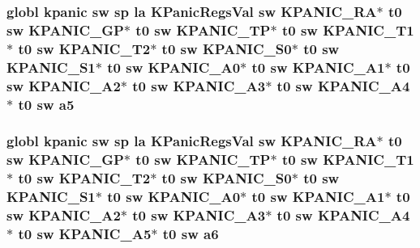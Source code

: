 \hypertarget{riscv_2kpanica_8S_a698ffd93e252f89c9bdbc8787de18d25}{
\subsubsection[{a5}]{\setlength{\rightskip}{0pt plus 5cm}globl {\bf kpanic} {\bf sw} {\bf sp} {\bf la} {\bf K\-Panic\-Regs\-Val} {\bf sw} {\bf K\-P\-A\-N\-I\-C\-\_\-\-R\-A}$\ast$ {\bf t0} {\bf sw} {\bf K\-P\-A\-N\-I\-C\-\_\-\-G\-P}$\ast$ {\bf t0} {\bf sw} {\bf K\-P\-A\-N\-I\-C\-\_\-\-T\-P}$\ast$ {\bf t0} {\bf sw} {\bf K\-P\-A\-N\-I\-C\-\_\-\-T1}$\ast$ {\bf t0} {\bf sw} {\bf K\-P\-A\-N\-I\-C\-\_\-\-T2}$\ast$ {\bf t0} {\bf sw} {\bf K\-P\-A\-N\-I\-C\-\_\-\-S0}$\ast$ {\bf t0} {\bf sw} {\bf K\-P\-A\-N\-I\-C\-\_\-\-S1}$\ast$ {\bf t0} {\bf sw} {\bf K\-P\-A\-N\-I\-C\-\_\-\-A0}$\ast$ {\bf t0} {\bf sw} {\bf K\-P\-A\-N\-I\-C\-\_\-\-A1}$\ast$ {\bf t0} {\bf sw} {\bf K\-P\-A\-N\-I\-C\-\_\-\-A2}$\ast$ {\bf t0} {\bf sw} {\bf K\-P\-A\-N\-I\-C\-\_\-\-A3}$\ast$ {\bf t0} {\bf sw} {\bf K\-P\-A\-N\-I\-C\-\_\-\-A4}$\ast$ {\bf t0} {\bf sw} a5}}\label{riscv_2kpanica_8S_a698ffd93e252f89c9bdbc8787de18d25}
\hypertarget{riscv_2kpanica_8S_a3bb72cecae8c679c54ce80df2f645ba6}{
\subsubsection[{a6}]{\setlength{\rightskip}{0pt plus 5cm}globl {\bf kpanic} {\bf sw} {\bf sp} {\bf la} {\bf K\-Panic\-Regs\-Val} {\bf sw} {\bf K\-P\-A\-N\-I\-C\-\_\-\-R\-A}$\ast$ {\bf t0} {\bf sw} {\bf K\-P\-A\-N\-I\-C\-\_\-\-G\-P}$\ast$ {\bf t0} {\bf sw} {\bf K\-P\-A\-N\-I\-C\-\_\-\-T\-P}$\ast$ {\bf t0} {\bf sw} {\bf K\-P\-A\-N\-I\-C\-\_\-\-T1}$\ast$ {\bf t0} {\bf sw} {\bf K\-P\-A\-N\-I\-C\-\_\-\-T2}$\ast$ {\bf t0} {\bf sw} {\bf K\-P\-A\-N\-I\-C\-\_\-\-S0}$\ast$ {\bf t0} {\bf sw} {\bf K\-P\-A\-N\-I\-C\-\_\-\-S1}$\ast$ {\bf t0} {\bf sw} {\bf K\-P\-A\-N\-I\-C\-\_\-\-A0}$\ast$ {\bf t0} {\bf sw} {\bf K\-P\-A\-N\-I\-C\-\_\-\-A1}$\ast$ {\bf t0} {\bf sw} {\bf K\-P\-A\-N\-I\-C\-\_\-\-A2}$\ast$ {\bf t0} {\bf sw} {\bf K\-P\-A\-N\-I\-C\-\_\-\-A3}$\ast$ {\bf t0} {\bf sw} {\bf K\-P\-A\-N\-I\-C\-\_\-\-A4}$\ast$ {\bf t0} {\bf sw} {\bf K\-P\-A\-N\-I\-C\-\_\-\-A5}$\ast$ {\bf t0} {\bf sw} a6}}\label{riscv_2kpanica_8S_a3bb72cecae8c679c54ce80df2f645ba6}
